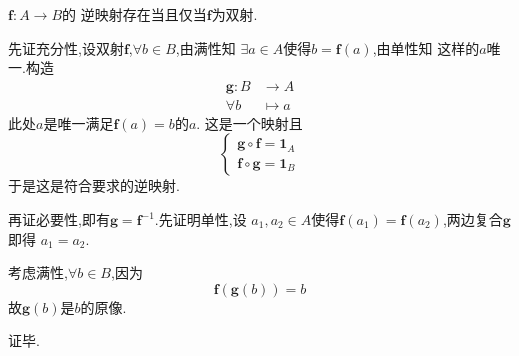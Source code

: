 \begin{green}
\begin{lemma}[逆映射存在性]\label{lemma:逆映射存在性}
    $\bm{f} : A \longrightarrow B$的
    逆映射存在当且仅当$\bm{f}$为双射.
\end{lemma}
\begin{Proof}
先证充分性,设双射$\bm{f}$,$\forall b\in B$,由满性知
$\exists a\in A$使得$b=\bm{f}\left(a\right)$,由单性知
这样的$a$唯一.构造
\begin{align*}
    \bm{g}:B&\longrightarrow A\\
    \forall b&\longmapsto a
\end{align*}
此处$a$是唯一满足$\bm{f}\left(a\right)=b$的$a$.
这是一个映射且
 \[
    \begin{cases*}
        \bm{g}\circ\bm{f}=\bm{1}_A\\
        \bm{f}\circ\bm{g}=\bm{1}_B
    \end{cases*}
    \]
于是这是符合要求的逆映射.

再证必要性,即有$\bm{g}=\bm{f}^{-1}$.先证明单性,设
$a_1,a_2\in A$使得$\bm{f}\left(a_1\right)=
\bm{f}\left(a_2\right)$,两边复合$\bm{g}$即得
$a_1=a_2.$

考虑满性,$\forall b\in B$,因为
\[
\bm{f}\left(\bm{g}\left(b\right)\right)=b
\]
故$\bm{g}\left(b\right)$是$b$的原像.

证毕.
\end{Proof}
\end{green}
